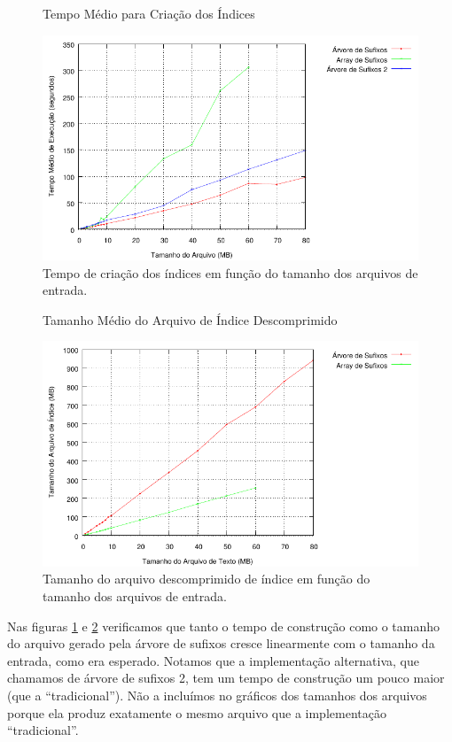 \documentclass[]{article}
\begin{document}
\begin{figure}
	{\centering Tempo Médio para Criação dos Índices\par}
	\includegraphics{images/index_criacao}
\caption{Tempo de criação dos índices em função do tamanho dos arquivos de entrada.}
\label{fig:e9}
\end{figure}

\begin{figure}
	{\centering Tamanho Médio do Arquivo de Índice Descomprimido\par}
	\includegraphics{images/index_tamanho}
\caption{Tamanho do arquivo descomprimido de índice em função do tamanho dos arquivos de entrada.}
\label{fig:e10}
\end{figure}


Nas figuras \ref{fig:e9} e \ref{fig:e10} verificamos que tanto o tempo de construção como o tamanho do arquivo gerado pela árvore de sufixos cresce linearmente com o tamanho da entrada, como era esperado. Notamos que a implementação alternativa, que chamamos de árvore de sufixos 2, tem um tempo de construção um pouco maior (que a ``tradicional''). Não a incluímos no gráficos dos tamanhos dos arquivos porque ela produz exatamente o mesmo arquivo que a implementação ``tradicional''.
\end{document}
